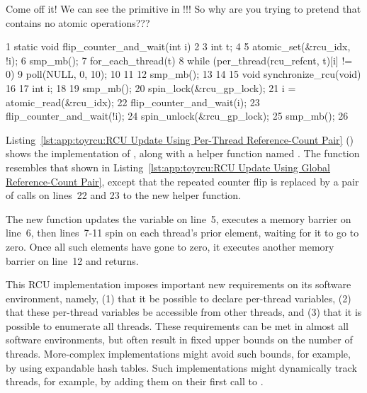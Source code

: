 \QuickQuiz{}
	Come off it!
	We can see the  primitive in
	!!!
	So why are you trying to pretend that 
	contains no atomic operations???
 \QuickQuizEnd

\begin{listing}[tbp]
{ \scriptsize
\begin{verbbox}
  1 static void flip_counter_and_wait(int i)
  2 {
  3   int t;
  4
  5   atomic_set(&rcu_idx, !i);
  6   smp_mb();
  7   for_each_thread(t) {
  8     while (per_thread(rcu_refcnt, t)[i] != 0) {
  9       poll(NULL, 0, 10);
 10     }
 11   }
 12   smp_mb();
 13 }
 14
 15 void synchronize_rcu(void)
 16 {
 17   int i;
 18
 19   smp_mb();
 20   spin_lock(&rcu_gp_lock);
 21   i = atomic_read(&rcu_idx);
 22   flip_counter_and_wait(i);
 23   flip_counter_and_wait(!i);
 24   spin_unlock(&rcu_gp_lock);
 25   smp_mb();
 26 }
\end{verbbox}
}
\centering
\theverbbox
\caption{RCU Update Using Per-Thread Reference-Count Pair}
\label{lst:app:toyrcu:RCU Update Using Per-Thread Reference-Count Pair}
\end{listing}

Listing~\ref{lst:app:toyrcu:RCU Update Using Per-Thread Reference-Count Pair}
()
shows the implementation of , along with a helper
function named .
The  function resembles that shown in
Listing~\ref{lst:app:toyrcu:RCU Update Using Global Reference-Count Pair},
except that the repeated counter flip is replaced by a pair of calls
on lines~22 and 23 to the new helper function.

The new  function updates the
 variable on line~5, executes a memory barrier on line~6,
then lines~7-11 spin on each thread's prior  element,
waiting for it to go to zero.
Once all such elements have gone to zero,
it executes another memory barrier on line~12 and returns.

This RCU implementation imposes important new requirements on its
software environment, namely, (1) that it be possible to declare
per-thread variables, (2) that these per-thread variables be accessible
from other threads, and (3) that it is possible to enumerate all threads.
These requirements can be met in almost all software environments,
but often result in fixed upper bounds on the number of threads.
More-complex implementations might avoid such bounds, for example, by using
expandable hash tables.
Such implementations might dynamically track threads, for example, by
adding them on their first call to .

